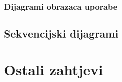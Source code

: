 
						
						
	
								
							
     
				\subsubsection{Dijagrami obrazaca uporabe}
					
				\eject		
				
			\subsection{Sekvencijski dijagrami}
				
				
    
				\eject
	
		\section{Ostali zahtjevi}
		
		 
			 
			 
			 
	